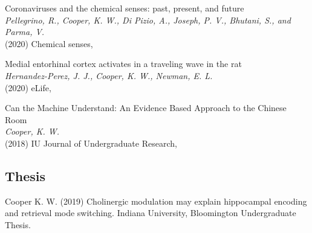 \documentclass[10pt]{cooperCV2}
\begin{document}
\begin{etaremune}[ resume, itemindent=-\bibhang, topsep=0pt,
				   itemsep=\bibsep,partopsep=0pt,parsep=0pt,leftmargin={\bibhang+\widthof{[999]}}]
	
    \item Coronaviruses and the chemical senses: past, present, and future \\
     \textit{Pellegrino, R., Cooper, K. W., Di Pizio, A., Joseph, P. V., Bhutani, S., and Parma, V. }\\
     (2020) Chemical senses, 
     
	
    \item Medial entorhinal cortex activates in a traveling wave in the rat \\
     \textit{Hernandez-Perez, J. J., Cooper, K. W., Newman, E. L.}\\
     (2020) eLife, 
     
	
    \item Can the Machine Understand: An Evidence Based Approach to the Chinese Room \\
     \textit{Cooper, K. W.}\\
     (2018) IU Journal of Undergraduate Research, 
     
	

\end{etaremune}


\vspace{0.1in}
\subsection{Thesis} 

\begin{etaremune}[resume,  itemindent=-\bibhang, topsep=0pt,
				   itemsep=\bibsep,partopsep=0pt,parsep=0pt,leftmargin={\bibhang+\widthof{[999]}}] 
    \item Cooper K. W. (2019) Cholinergic modulation may explain hippocampal encoding and retrieval mode switching. Indiana University, Bloomington Undergraduate Thesis. 

\end{etaremune}





















\end{document}
